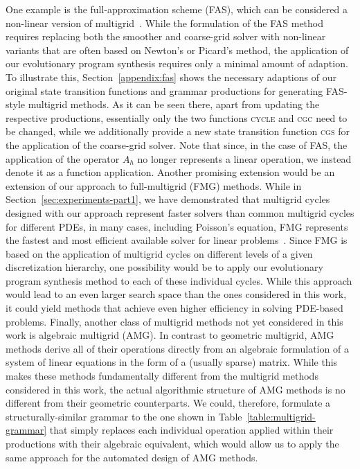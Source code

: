 One example is the full-approximation scheme (FAS), which can be considered a non-linear version of multigrid~\cite{trottenberg2000multigrid,briggs2000multigrid}.
While the formulation of the FAS method requires replacing both the smoother and coarse-grid solver with non-linear variants that are often based on Newton's or Picard's method, the application of our evolutionary program synthesis requires only a minimal amount of adaption.
To illustrate this, Section~\ref{appendix:fas} shows the necessary adaptions of our original state transition functions and grammar productions for generating FAS-style multigrid methods. 
As it can be seen there, apart from updating the respective productions, essentially only the two functions \textsc{cycle} and \textsc{cgc} need to be changed, while we additionally provide a new state transition function \textsc{cgs} for the application of the coarse-grid solver. 
Note that since, in the case of FAS, the application of the operator $A_h$ no longer represents a linear operation, we instead denote it as a function application.
Another promising extension would be an extension of our approach to full-multigrid (FMG) methods.
While in Section~\ref{sec:experiments-part1}, we have demonstrated that multigrid cycles designed with our approach represent faster solvers than common multigrid cycles for different PDEs, in many cases, including Poisson's equation, FMG represents the fastest and most efficient available solver for linear problems~\cite{trottenberg2000multigrid}.
Since FMG is based on the application of multigrid cycles on different levels of a given discretization hierarchy, one possibility would be to apply our evolutionary program synthesis method to each of these individual cycles.
While this approach would lead to an even larger search space than the ones considered in this work, it could yield methods that achieve even higher efficiency in solving PDE-based problems.
Finally, another class of multigrid methods not yet considered in this work is algebraic multigrid (AMG).
In contrast to geometric multigrid, AMG methods derive all of their operations directly from an algebraic formulation of a system of linear equations in the form of a (usually sparse) matrix.
While this makes these methods fundamentally different from the multigrid methods considered in this work, the actual algorithmic structure of AMG methods is no different from their geometric counterparts.
We could, therefore, formulate a structurally-similar grammar to the one shown in Table~\ref{table:multigrid-grammar} that simply replaces each individual operation applied within their productions with their algebraic equivalent, which would allow us to apply the same approach for the automated design of AMG methods.
